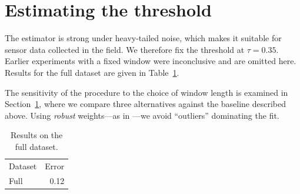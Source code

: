 \section{Estimating the threshold}\label{sec:thr}

The estimator is strong under heavy-tailed noise,
which makes it suitable for sensor data collected
in the field. We therefore fix the threshold at
$\tau = 0.35$.
Earlier experiments with a fixed window were
inconclusive and are omitted here.
Results for the full dataset are given in
Table~\ref{tab:full}.

The sensitivity of the procedure to the choice of window length is examined
in Section~\ref{sec:thr}, where we compare three alternatives against the
baseline described above. Using \emph{robust} weights---as in \method{}---we
avoid ``outliers'' dominating the fit.

\begin{table}[h]
\centering
\begin{tabular}{lr}
Dataset & Error \\
Full & 0.12 \\
\end{tabular}
\caption{Results on the full dataset.}\label{tab:full}
\end{table}
